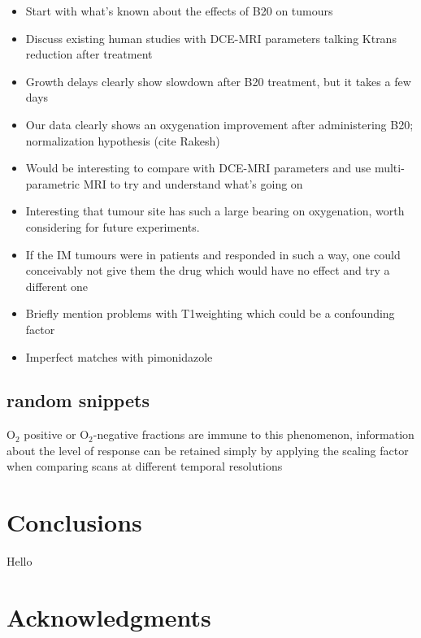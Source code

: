 \documentclass[num-refs]{wiley-article}
\begin{document}
\begin{itemize}
    \item Start with what's known about the effects of B20 on tumours
    \item Discuss existing human studies with DCE-MRI parameters talking Ktrans reduction after treatment
    \item Growth delays clearly show slowdown after B20 treatment, but it takes a few days
    \item Our data clearly shows an oxygenation improvement after administering B20; normalization hypothesis (cite Rakesh)
    \item Would be interesting to compare with DCE-MRI parameters and use multi-parametric MRI to try and understand what's going on 
    \item Interesting that tumour site has such a large bearing on oxygenation, worth considering for future experiments. 
    \item If the IM tumours were in patients and responded in such a way, one could conceivably not give them the drug which would have no effect and try a different one
    \item Briefly mention problems with T1weighting which could be a confounding factor
    \item Imperfect matches with pimonidazole
\end{itemize}

\subsection{random snippets}
O$_2$ positive or O$_2$-negative fractions are immune to this phenomenon, information about the level of response can be retained simply by applying the scaling factor when comparing scans at different temporal resolutions
\section{Conclusions}
Hello

\section{Acknowledgments}
\end{document}
